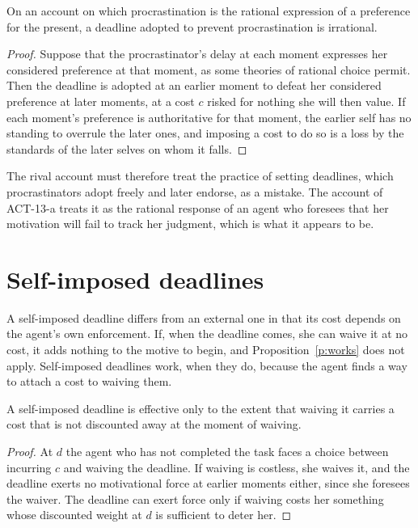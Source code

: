 \documentclass{situationist-preprint}
\begin{document}
\begin{proposition}\label{p:pointless}
On an account on which procrastination is the rational expression of a preference for the present, a deadline adopted to prevent procrastination is irrational.
\end{proposition}

\begin{proof}
Suppose that the procrastinator's delay at each moment expresses her considered preference at that moment, as some theories of rational choice permit. Then the deadline is adopted at an earlier moment to defeat her considered preference at later moments, at a cost $c$ risked for nothing she will then value. If each moment's preference is authoritative for that moment, the earlier self has no standing to overrule the later ones, and imposing a cost to do so is a loss by the standards of the later selves on whom it falls.
\end{proof}

The rival account must therefore treat the practice of setting deadlines, which procrastinators adopt freely and later endorse, as a mistake. The account of ACT-13-a treats it as the rational response of an agent who foresees that her motivation will fail to track her judgment, which is what it appears to be.

\section{Self-imposed deadlines}

A self-imposed deadline differs from an external one in that its cost depends on the agent's own enforcement. If, when the deadline comes, she can waive it at no cost, it adds nothing to the motive to begin, and Proposition~\ref{p:works} does not apply. Self-imposed deadlines work, when they do, because the agent finds a way to attach a cost to waiving them.

\begin{proposition}\label{p:self}
A self-imposed deadline is effective only to the extent that waiving it carries a cost that is not discounted away at the moment of waiving.
\end{proposition}

\begin{proof}
At $d$ the agent who has not completed the task faces a choice between incurring $c$ and waiving the deadline. If waiving is costless, she waives it, and the deadline exerts no motivational force at earlier moments either, since she foresees the waiver. The deadline can exert force only if waiving costs her something whose discounted weight at $d$ is sufficient to deter her.
\end{proof}
\end{document}
